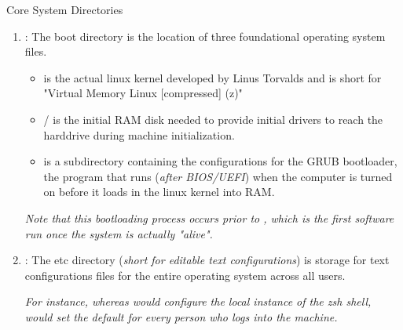 \documentclass[10pt]{article}
\begin{document}
\begin{core}[label=core:coresd]{Core System Directories}
\begin{enumerate}
        \item {} : The boot directory is the location of three foundational operating system files.

          \begin{itemize}

            \item {} is the actual linux kernel developed by Linus Torvalds and is short for "Virtual Memory Linux [compressed] (z)"

            \item {} /  is the initial RAM disk needed to provide initial drivers to reach the harddrive during machine initialization.

            \item {} is a subdirectory containing the configurations for the GRUB bootloader, the program that runs (\textit{after BIOS/UEFI}) when the computer is turned on before it loads in the linux kernel into RAM.

          \end{itemize} 

        \textit{Note that this bootloading process occurs prior to , which is the first software run once the system is actually "alive".}

        \item {} : The etc directory (\textit{short for editable text configurations}) is storage for text configurations files for the entire operating system across all users.

        \textit{For instance, whereas  would configure the local instance of the zsh shell,  would set the default for every person who logs into the machine.}

      \end{enumerate}

    \end{core}
\end{document}
